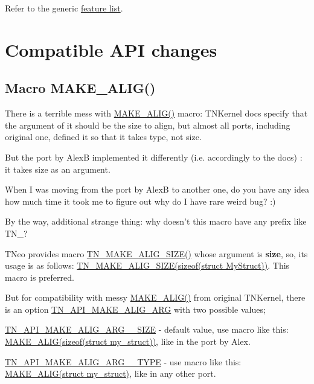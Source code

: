 Refer to the generic \hyperlink{features}{feature list}.\hypertarget{tnkernel_diff_tnkernel_new_api}{}\section{Compatible A\+P\+I changes}\label{tnkernel_diff_tnkernel_new_api}
\hypertarget{tnkernel_diff_tnkernel_diff_make_alig}{}\subsection{Macro M\+A\+K\+E\+\_\+\+A\+L\+I\+G()}\label{tnkernel_diff_tnkernel_diff_make_alig}
There is a terrible mess with {\ttfamily \hyperlink{tn__oldsymbols_8h_aa42d2e6b5b7ff37bd485803fa2cb70a8}{M\+A\+K\+E\+\_\+\+A\+L\+I\+G()}} macro\+: T\+N\+Kernel docs specify that the argument of it should be the size to align, but almost all ports, including original one, defined it so that it takes type, not size.

But the port by Alex\+B implemented it differently (i.\+e. accordingly to the docs) \+: it takes size as an argument.

When I was moving from the port by Alex\+B to another one, do you have any idea how much time it took me to figure out why do I have rare weird bug? \+:)

By the way, additional strange thing\+: why doesn't this macro have any prefix like {\ttfamily T\+N\+\_\+}?

T\+Neo provides macro {\ttfamily \hyperlink{tn__common_8h_a3f48380e8a624edc643319a81192d88e}{T\+N\+\_\+\+M\+A\+K\+E\+\_\+\+A\+L\+I\+G\+\_\+\+S\+I\+Z\+E()}} whose argument is {\bfseries size}, so, its usage is as follows\+: {\ttfamily \hyperlink{tn__common_8h_a3f48380e8a624edc643319a81192d88e}{T\+N\+\_\+\+M\+A\+K\+E\+\_\+\+A\+L\+I\+G\+\_\+\+S\+I\+Z\+E(sizeof(struct My\+Struct))}}. This macro is preferred.

But for compatibility with messy {\ttfamily \hyperlink{tn__oldsymbols_8h_aa42d2e6b5b7ff37bd485803fa2cb70a8}{M\+A\+K\+E\+\_\+\+A\+L\+I\+G()}} from original T\+N\+Kernel, there is an option {\ttfamily \hyperlink{tn__cfg__default_8h_a2a1148efc6a74131cc83ee50cbc386cd}{T\+N\+\_\+\+A\+P\+I\+\_\+\+M\+A\+K\+E\+\_\+\+A\+L\+I\+G\+\_\+\+A\+R\+G}} with two possible values;


\begin{DoxyItemize}
\item {\ttfamily \hyperlink{tn__cfg__dispatch_8h_a4972bf0cbc72e51a7463cf7d786d2b64}{T\+N\+\_\+\+A\+P\+I\+\_\+\+M\+A\+K\+E\+\_\+\+A\+L\+I\+G\+\_\+\+A\+R\+G\+\_\+\+\_\+\+S\+I\+Z\+E}} -\/ default value, use macro like this\+: {\ttfamily \hyperlink{tn__oldsymbols_8h_aa42d2e6b5b7ff37bd485803fa2cb70a8}{M\+A\+K\+E\+\_\+\+A\+L\+I\+G(sizeof(struct my\+\_\+struct))}}, like in the port by Alex.
\item {\ttfamily \hyperlink{tn__cfg__dispatch_8h_a04321413cf21754a05682b298df0493d}{T\+N\+\_\+\+A\+P\+I\+\_\+\+M\+A\+K\+E\+\_\+\+A\+L\+I\+G\+\_\+\+A\+R\+G\+\_\+\+\_\+\+T\+Y\+P\+E}} -\/ use macro like this\+: {\ttfamily \hyperlink{tn__oldsymbols_8h_aa42d2e6b5b7ff37bd485803fa2cb70a8}{M\+A\+K\+E\+\_\+\+A\+L\+I\+G(struct my\+\_\+struct)}}, like in any other port.
\end{DoxyItemize}

